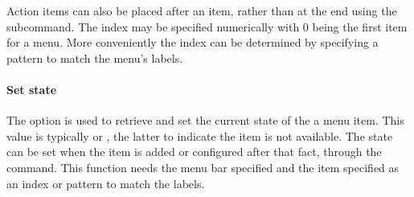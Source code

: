 Action items can also be placed after an item, rather than at the end
using the  subcommand. The
index may be specified numerically with 0 being the first item for a
menu.  More conveniently the index can be determined by specifying a
pattern to match the menu's labels.


\paragraph{Set state}
The  option is used to retrieve and set the current state of the a menu item.
This value is typically  or
, the latter to indicate the item is not available. The
state can be set when the item is added or configured after that fact,
through the  command. This function
needs the menu bar specified and the item specified as an index or
pattern to match the labels.


